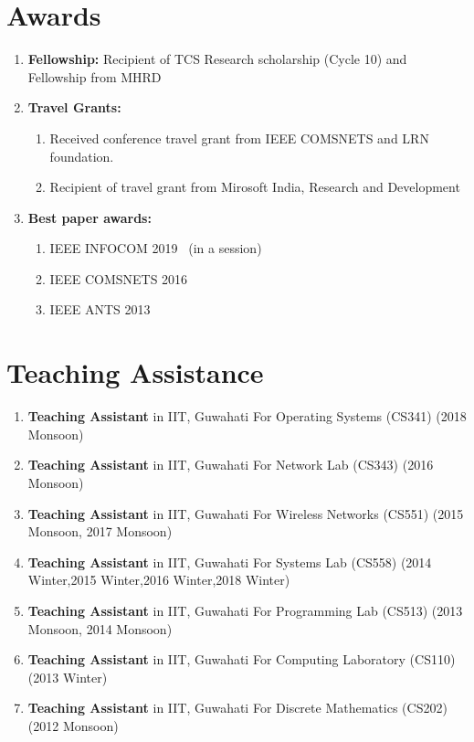\documentclass{article}
\begin{document}
\section{Awards}
	\begin{enumerate}
		\item{\bf Fellowship:} Recipient of TCS Research scholarship (Cycle 10) and Fellowship from MHRD
		\item {\bf Travel Grants:} 
			\begin{enumerate}
				\item Received conference travel grant from IEEE COMSNETS and LRN foundation.
				\item Recipient of travel grant from Mirosoft India, Research and Development
			\end{enumerate}
		\item {\bf Best paper awards:} 
			\begin{enumerate}
				\item IEEE INFOCOM 2019~\cite{chattopadhyay2018aloe} (in a session)
				\item IEEE COMSNETS 2016~\cite{chakraborty2016es2}
				\item IEEE ANTS 2013~\cite{chakraborty2013surpassing}
			\end{enumerate}
	\end{enumerate}
\section{Teaching Assistance}	
	\begin{enumerate}
	 \item {\bf Teaching Assistant} in IIT, Guwahati For Operating Systems (CS341) (2018 Monsoon)
	 \item {\bf Teaching Assistant} in IIT, Guwahati For Network Lab (CS343) (2016 Monsoon)
	 \item {\bf Teaching Assistant} in IIT, Guwahati For Wireless Networks (CS551) (2015 Monsoon, 2017 Monsoon)
	 \item {\bf Teaching Assistant} in IIT, Guwahati For Systems Lab (CS558) (2014 Winter,2015 Winter,2016 Winter,2018 Winter)
	 \item {\bf Teaching Assistant} in IIT, Guwahati For Programming Lab (CS513) (2013 Monsoon, 2014 Monsoon)
	 \item {\bf Teaching Assistant} in IIT, Guwahati For Computing Laboratory (CS110) (2013 Winter)
	 \item {\bf Teaching Assistant} in IIT, Guwahati For Discrete Mathematics (CS202)  (2012 Monsoon)
	\end{enumerate}
\end{document}
